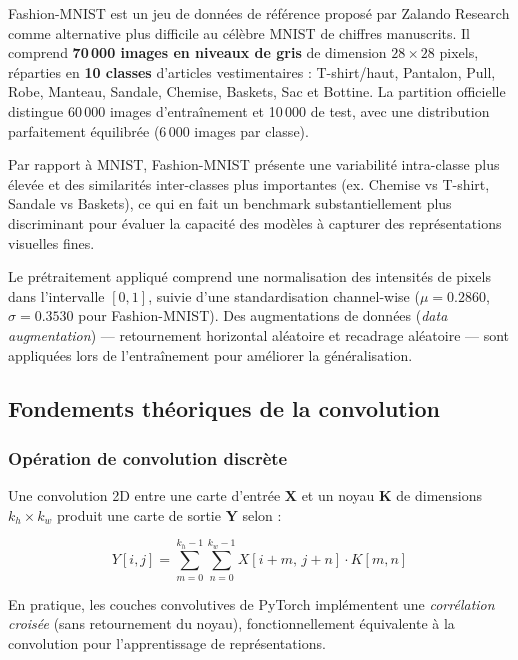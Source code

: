 \documentclass[11pt,a4paper]{article}
\begin{document}
Fashion-MNIST \cite{xiao2017fashion} est un jeu de données de référence proposé par
Zalando Research comme alternative plus difficile au célèbre MNIST de chiffres manuscrits.
Il comprend \textbf{70\,000 images en niveaux de gris} de dimension $28 \times 28$
pixels, réparties en \textbf{10 classes} d'articles vestimentaires : T-shirt/haut,
Pantalon, Pull, Robe, Manteau, Sandale, Chemise, Baskets, Sac et Bottine.
La partition officielle distingue 60\,000 images d'entraînement et 10\,000 de test,
avec une distribution parfaitement équilibrée (6\,000 images par classe).

Par rapport à MNIST, Fashion-MNIST présente une variabilité intra-classe plus élevée
et des similarités inter-classes plus importantes (ex. Chemise vs T-shirt, Sandale vs
Baskets), ce qui en fait un benchmark substantiellement plus discriminant pour évaluer
la capacité des modèles à capturer des représentations visuelles fines.

Le prétraitement appliqué comprend une normalisation des intensités de pixels dans
l'intervalle $[0,1]$, suivie d'une standardisation channel-wise ($\mu = 0.2860$,
$\sigma = 0.3530$ pour Fashion-MNIST). Des augmentations de données (\textit{data
augmentation}) — retournement horizontal aléatoire et recadrage aléatoire —
sont appliquées lors de l'entraînement pour améliorer la généralisation.

\subsection{Fondements théoriques de la convolution}

\subsubsection{Opération de convolution discrète}

Une convolution 2D entre une carte d'entrée $\mathbf{X}$ et un noyau $\mathbf{K}$ de
dimensions $k_h \times k_w$ produit une carte de sortie $\mathbf{Y}$ selon :

\begin{equation}
  Y[i, j] = \sum_{m=0}^{k_h-1} \sum_{n=0}^{k_w-1}
             X[i+m,\, j+n] \cdot K[m, n]
  \label{eq:convolution}
\end{equation}

En pratique, les couches convolutives de PyTorch implémentent une \textit{corrélation
croisée} (sans retournement du noyau), fonctionnellement équivalente à la convolution
pour l'apprentissage de représentations.
\end{document}
